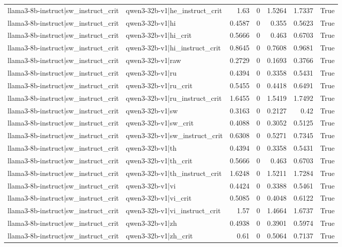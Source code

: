 \begin{table}
\begin{tabular}{l l r r r r l}
llama3-8b-instruct|sw_instruct_crit & qwen3-32b-v1|he_instruct_crit & 1.63 & 0 & 1.5264 & 1.7337 & True \\
llama3-8b-instruct|sw_instruct_crit & qwen3-32b-v1|hi & 0.4587 & 0 & 0.355 & 0.5623 & True \\
llama3-8b-instruct|sw_instruct_crit & qwen3-32b-v1|hi_crit & 0.5666 & 0 & 0.463 & 0.6703 & True \\
llama3-8b-instruct|sw_instruct_crit & qwen3-32b-v1|hi_instruct_crit & 0.8645 & 0 & 0.7608 & 0.9681 & True \\
llama3-8b-instruct|sw_instruct_crit & qwen3-32b-v1|raw & 0.2729 & 0 & 0.1693 & 0.3766 & True \\
llama3-8b-instruct|sw_instruct_crit & qwen3-32b-v1|ru & 0.4394 & 0 & 0.3358 & 0.5431 & True \\
llama3-8b-instruct|sw_instruct_crit & qwen3-32b-v1|ru_crit & 0.5455 & 0 & 0.4418 & 0.6491 & True \\
llama3-8b-instruct|sw_instruct_crit & qwen3-32b-v1|ru_instruct_crit & 1.6455 & 0 & 1.5419 & 1.7492 & True \\
llama3-8b-instruct|sw_instruct_crit & qwen3-32b-v1|sw & 0.3163 & 0 & 0.2127 & 0.42 & True \\
llama3-8b-instruct|sw_instruct_crit & qwen3-32b-v1|sw_crit & 0.4088 & 0 & 0.3052 & 0.5125 & True \\
llama3-8b-instruct|sw_instruct_crit & qwen3-32b-v1|sw_instruct_crit & 0.6308 & 0 & 0.5271 & 0.7345 & True \\
llama3-8b-instruct|sw_instruct_crit & qwen3-32b-v1|th & 0.4394 & 0 & 0.3358 & 0.5431 & True \\
llama3-8b-instruct|sw_instruct_crit & qwen3-32b-v1|th_crit & 0.5666 & 0 & 0.463 & 0.6703 & True \\
llama3-8b-instruct|sw_instruct_crit & qwen3-32b-v1|th_instruct_crit & 1.6248 & 0 & 1.5211 & 1.7284 & True \\
llama3-8b-instruct|sw_instruct_crit & qwen3-32b-v1|vi & 0.4424 & 0 & 0.3388 & 0.5461 & True \\
llama3-8b-instruct|sw_instruct_crit & qwen3-32b-v1|vi_crit & 0.5085 & 0 & 0.4048 & 0.6122 & True \\
llama3-8b-instruct|sw_instruct_crit & qwen3-32b-v1|vi_instruct_crit & 1.57 & 0 & 1.4664 & 1.6737 & True \\
llama3-8b-instruct|sw_instruct_crit & qwen3-32b-v1|zh & 0.4938 & 0 & 0.3901 & 0.5974 & True \\
llama3-8b-instruct|sw_instruct_crit & qwen3-32b-v1|zh_crit & 0.61 & 0 & 0.5064 & 0.7137 & True \\

\end{tabular}
\end{table}
